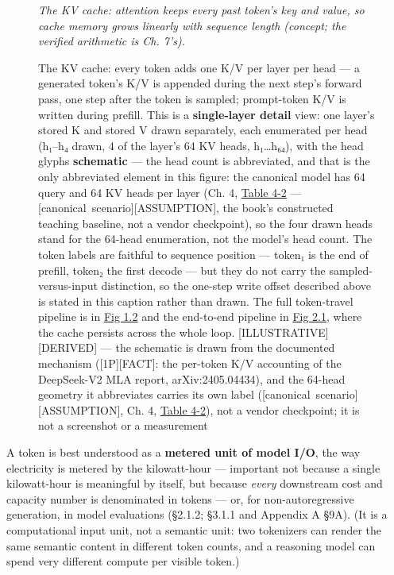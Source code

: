 \begin{figure}
\caption[The KV cache: every token adds one K/V per layer per head]{The KV cache: every token adds one K/V per layer per head --- a generated token's K/V is appended during the next step's forward pass, one step after the token is sampled; prompt-token K/V is written during prefill. This is a \textbf{single-layer detail} view: one layer's stored K and stored V drawn separately, each enumerated per head (h₁--h₄ drawn, 4 of the layer's 64 KV heads, h₁\ldots h₆₄), with the head glyphs \textbf{schematic} --- the head count is abbreviated, and that is the only abbreviated element in this figure: the canonical model has 64 query and 64 KV heads per layer (Ch. 4, \hyperref[tab:4.2]{Table 4-2} --- \mbox{{[}canonical scenario{]}}\hspace{0pt}\mbox{{[}ASSUMPTION{]}}, the book's constructed teaching baseline, not a vendor checkpoint), so the four drawn heads stand for the 64-head enumeration, not the model's head count. The token labels are faithful to sequence position --- token₁ is the end of prefill, token₂ the first decode --- but they do not carry the sampled-versus-input distinction, so the one-step write offset described above is stated in this caption rather than drawn. The full token-travel pipeline is in \hyperref[fig:1.2]{Fig 1.2} and the end-to-end pipeline in \hyperref[fig:2.1]{Fig 2.1}, where the cache persists across the whole loop. \mbox{{[}ILLUSTRATIVE{]}}\hspace{0pt}\mbox{{[}DERIVED{]}} --- the schematic is drawn from the documented mechanism (\mbox{{[}1P{]}}\hspace{0pt}\mbox{{[}FACT{]}}: the per-token K/V accounting of the DeepSeek-V2 MLA report, arXiv:2405.04434), and the 64-head geometry it abbreviates carries its own label (\mbox{{[}canonical scenario{]}}\hspace{0pt}\mbox{{[}ASSUMPTION{]}}, Ch. 4, \hyperref[tab:4.2]{Table 4-2}), not a vendor checkpoint; it is not a screenshot or a measurement}

\label{fig:1.1}\emph{The KV cache: attention keeps every past token's key and value, so
cache memory grows linearly with sequence length (concept; the verified
arithmetic is Ch. 7's).}

\end{figure}\label{mental-model}


A token is best understood as a \textbf{metered unit of model I/O}, the
way electricity is metered by the kilowatt-hour --- important not
because a single kilowatt-hour is meaningful by itself, but because
\emph{every} downstream cost and capacity number is denominated in
tokens --- or, for non-autoregressive generation, in model evaluations
(§2.1.2; §3.1.1 and Appendix A §9A). (It is a computational input unit,
not a semantic unit: two tokenizers can render the same semantic content
in different token counts, and a reasoning model can spend very
different compute per visible token.)

